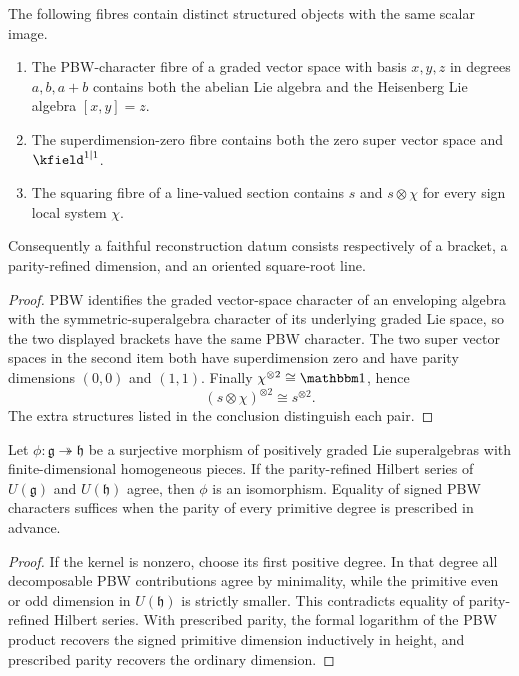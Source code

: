 \begin{theorem}
The following fibres contain distinct structured objects with the same scalar image.
\begin{enumerate}
\item The PBW-character fibre of a graded vector space with basis $x,y,z$ in degrees $a,b,a+b$ contains both the abelian Lie algebra and the Heisenberg Lie algebra $[x,y]=z$.
\item The superdimension-zero fibre contains both the zero super vector space and $\kfield^{1|1}$.
\item The squaring fibre of a line-valued section contains $s$ and $s\otimes\chi$ for every sign local system $\chi$.
\end{enumerate}
Consequently a faithful reconstruction datum consists respectively of a bracket, a parity-refined dimension, and an oriented square-root line.
\end{theorem}
\begin{proof}
PBW identifies the graded vector-space character of an enveloping algebra with the symmetric-superalgebra character of its underlying graded Lie space, so the two displayed brackets have the same PBW character.  The two super vector spaces in the second item both have superdimension zero and have parity dimensions $(0,0)$ and $(1,1)$.  Finally $\chi^{\otimes2}\cong\mathbbm1$, hence
\[
 (s\otimes\chi)^{\otimes2}\cong s^{\otimes2}.
\]
The extra structures listed in the conclusion distinguish each pair.
\end{proof}

\begin{recognition}
Let $\phi:\mathfrak g\twoheadrightarrow\mathfrak h$ be a surjective morphism of positively graded Lie superalgebras with finite-dimensional homogeneous pieces.  If the parity-refined Hilbert series of $U(\mathfrak g)$ and $U(\mathfrak h)$ agree, then $\phi$ is an isomorphism.  Equality of signed PBW characters suffices when the parity of every primitive degree is prescribed in advance.
\end{recognition}
\begin{proof}
If the kernel is nonzero, choose its first positive degree.  In that degree all decomposable PBW contributions agree by minimality, while the primitive even or odd dimension in $U(\mathfrak h)$ is strictly smaller.  This contradicts equality of parity-refined Hilbert series.  With prescribed parity, the formal logarithm of the PBW product recovers the signed primitive dimension inductively in height, and prescribed parity recovers the ordinary dimension.
\end{proof}

